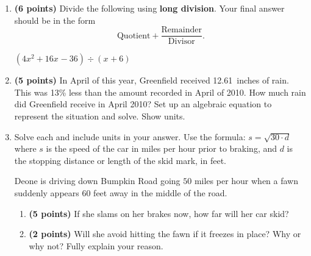 \documentclass[12pt]{amsart}
\begin{document}
\begin{enumerate}
  
\vfill \vfill \vfill
\def \a{6}\def \b{4}\def \c{-8}\def \r{12}\def \monicpol{x^{}+6}\def \longnbad{4x^{2}+16x^{}-36}\def \anspol{4x^{}-8}
\item {\bf (6 points)} 
 Divide the following using {\bf long division}. Your final answer should be in the form $$ \text{Quotient} + \dfrac{\text{Remainder}}{\text{Divisor}}.$$

\vspace{3mm}

$(\longnbad) \div (\monicpol)$

\vfill  \vfill \vfill
\newpage\def \discount{13}\def \paid{1105.31}\def \rainy{12.61}\def \orcost{1270.47}\def \purcost{978.15}\def \orrainy{14.49}
\item {\bf (5 points)} 
 In April of this year, Greenfield received \rainy\ inches of rain. This was \discount\% less than the amount recorded in April of 2010. How much rain did Greenfield  receive in April 2010? Set up an algebraic equation to represent the situation and solve. Show units.

\vfill 
\def \insvar{30}\def \d{60}\def \zerospeed{42.43}\def \slimit{50}\def \s{63}\def \skidd{132.3}\def \safed{83.333}\def \rsafed{83}

 
\item Solve each and include units in your answer. Use the formula: $s = \sqrt{\insvar \cdot d}$ where $s$ is the speed of the car in miles per hour prior to braking, and $d$ is the stopping distance or length of the skid mark, in feet. 

\vspace{3mm}

Deone is driving down Bumpkin Road going $\slimit$ miles per hour when a fawn suddenly appears $\d$ feet away in the middle of the road. \begin{enumerate}
\item {\bf (5 points)} If she slams on her brakes now, how far will her car skid? \vspace{4cm}
\item {\bf (2 points)} Will she avoid hitting the fawn if it freezes in place? Why or why not? Fully explain your reason. \vspace{3cm}
\end{enumerate}



\end{enumerate}
\end{document}
